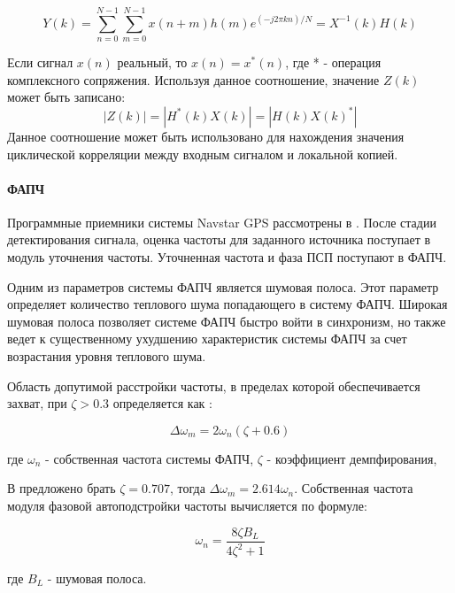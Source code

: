\begin{equation}
	\label{eq:fft_corr_fft_rev}
	Y(k) = \sum\limits_{n=0}^{N-1}\sum\limits_{m=0}^{N-1}{x(n+m)h(m)e^{(-j2\pi{kn})/N}}=X^{-1}(k)H(k)
\end{equation}

Если сигнал $x(n)$ реальный, то $x(n) = x^*(n)$, где * - операция комплексного сопряжения. Используя данное соотношение,
значение $Z(k)$ может быть записано:
\begin{equation}
	\label{eq:fft_magnitude}
	|Z(k)|=|H^*(k)X(k)|=|H(k)X(k)^*|
\end{equation}
Данное соотношение может быть использовано для нахождения значения циклической корреляции между входным сигналом и 
локальной копией.

\paragraph{ФАПЧ}
Программные приемники системы Navstar GPS рассмотрены в \cite{tsui, akos-book}.
После стадии детектирования сигнала, оценка частоты для заданного источника поступает в модуль уточнения частоты.
Уточненная частота и фаза ПСП поступают в ФАПЧ.

Одним из параметров системы ФАПЧ является шумовая полоса.
Этот параметр определяет количество теплового шума попадающего в систему ФАПЧ. Широкая шумовая полоса позволяет системе ФАПЧ быстро войти в синхронизм,
но также ведет к существенному ухудшению характеристик системы ФАПЧ за счет возрастания уровня теплового шума.

Область допутимой расстройки частоты, в пределах которой обеспечивается захват, при ${\zeta>0.3}$ определяется как \cite{spilker-book}:
\begin{center}
\begin{equation}
	\label{eq:corr_pll_band}
	\Delta \omega_m = 2 \omega_n (\zeta + 0.6)
\end{equation}
\end{center}
где ${\omega_n}$ - собственная частота системы ФАПЧ, ${\zeta}$ - коэффициент демпфирования,

В \cite{tsui, spilker-book} предложено брать ${\zeta=0.707}$, тогда ${\Delta \omega_m = 2.614 \omega_n}$.
Собственная частота модуля фазовой автоподстройки частоты вычисляется по формуле:
\begin{center}
\begin{equation}
	\label{eq:corr_pll_freq}
	\omega_n = \frac{8 \zeta B_L}{4 \zeta^2 + 1} 
\end{equation}
\end{center}
где ${B_L}$ - шумовая полоса.


